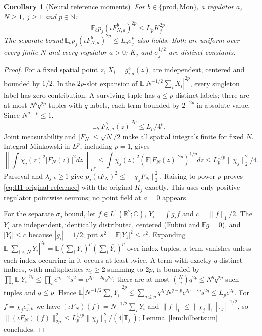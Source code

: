 \documentclass[11pt]{article}
\theoremstyle{plain}
\newtheorem{corollary}[theorem]{Corollary}
\theoremstyle{definition}
\theoremstyle{remark}
\newcommand{\R}{\mathbb{R}}
\newcommand{\C}{\mathbb{C}}
\newcommand{\N}{\mathbb{N}}
\newcommand{\E}{\mathbb{E}}
\newcommand{\T}{\mathbb{T}}
\newcommand{\bprod}{\mathrm{prod}}
\newcommand{\bMon}{\mathrm{Mon}}
\newcommand{\conj}[1]{\overline{#1}}
\begin{document}
\begin{corollary}[Neural reference moments]\label{cor:neuralref}
For $b\in\{\bprod,\bMon\}$, a regulator $a$, $N\ge1$, $j\ge1$ and $p\in\N$:
\begin{equation}\label{eq:H1-original-reference}
 \E_b p_j(\iota F^b_{N,a})^{2p}\le L_p K_j^{2p}.
\end{equation}
The separate bound $\E_b p_j(\iota F^b_{N,a})^{2p}\le L_p\sigma_j^p$
also holds. Both are uniform over every finite $N$ and every regulator $a>0$;
$K_j$ and $\sigma_j^{1/2}$ are distinct constants.
\end{corollary}

\begin{proof}
For a fixed spatial point $z$, $X_i=g^b_{i,a}(z)$ are independent,
centered and bounded by $1/2$. In the $2p$-slot expansion of
$\E|N^{-1/2}\sum_iX_i|^{2p}$, every singleton label has zero contribution.
A surviving tuple has $q\le p$ distinct labels; there are at most
$N^qq^{2p}$ tuples with $q$ labels, each term bounded by $2^{-2p}$ in
absolute value. Since $N^{q-p}\le1$,
\begin{equation}\label{eq:H1-pointwise}
 \E_b|F^b_{N,a}(z)|^{2p}\le L_p/4^p.
\end{equation}
Joint measurability and $|F_N|\le\sqrt N/2$ make all spatial integrals
finite for fixed $N$. Integral Minkowski in $L^p$, including $p=1$, gives
\[
 \left\|\int\chi_j(z)^2|F_N(z)|^2dz\right\|_{L^p}
 \le\int\chi_j(z)^2(\E|F_N(z)|^{2p})^{1/p}dz
 \le L_p^{1/p}\|\chi_j\|_2^2/4.
\]
Parseval and $\lambda_{j,k}\ge1$ give
$p_j(\iota F_N)^2\le\|\chi_jF_N\|_2^2$. Raising to power $p$ proves
\eqref{eq:H1-original-reference} with the original $K_j$ exactly.
This uses only positive-regulator pointwise neurons; no point field at
$a=0$ appears.

For the separate $\sigma_j$ bound, let $f\in L^1(\R^2;\C)$,
$Y_i=\int g_if$ and $c=\|f\|_1/2$. The $Y_i$ are independent,
identically distributed, centered (Fubini and $\E g=0$), and $|Y_i|\le c$ because
$|g_i|=1/2$; put $s^{2}=\E|Y_1|^{2}\le c^{2}$. Expanding
$\E|\sum_{i\le N}Y_i|^{2p}=\E(\sum_iY_i)^{p}(\sum_i\conj{Y_i})^{p}$ over index tuples, a term
vanishes unless each index occurring in it occurs at least twice. A term with
exactly $q$ distinct indices, with multiplicities $n_i\ge2$ summing to $2p$, is
bounded by $\prod_i\E|Y_i|^{n_i}\le\prod_ic^{n_i-2}s^{2}=c^{2p-2q}s^{2q}$; there are at most
$\binom Nqq^{2p}\le N^{q}q^{2p}$ such tuples and $q\le p$. Hence
$\E|N^{-1/2}\sum_iY_i|^{2p}\le\sum_{q\le p}q^{2p}N^{q-p}c^{2p-2q}s^{2q}\le L_pc^{2p}$. For
$f=\chi_j\conj{e_{j,k}}$ we have $(\iota F_N)(f)=N^{-1/2}\sum_iY_i$ and
$\|f\|_1\le\|\chi_j\|_1|\T_j|^{-1/2}$, so $\|(\iota F_N)(f)\|_{2p}^{2}\le L_p^{1/p}\|\chi_j\|_1^{2}/(4|\T_j|)$;
Lemma~\ref{lem:hilbertsum} concludes.
\end{proof}
\end{document}
